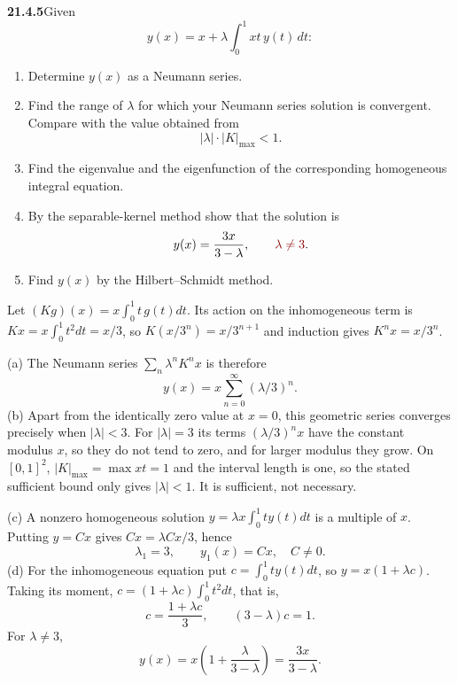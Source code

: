 \par\bigskip
\noindent\textbf{21.4.5}\quad Given
\[
y(x)=x+\lambda\int_{0}^{1}xt\,y(t)\,dt:
\]
\begin{enumerate}
\item[(a)] Determine $y(x)$ as a Neumann series.
\item[(b)] Find the range of $\lambda$ for which your Neumann
series solution is convergent. Compare with the value obtained
from
\[
|\lambda|\cdot|K|_{\max}<1.
\]
\item[(c)] Find the eigenvalue and the eigenfunction of the
corresponding homogeneous integral equation.
\item[(d)] By the separable-kernel method show that the solution
is
\[
y(x)=\frac{3x}{3-\lambda},\qquad\erratum{\lambda\ne3}.
\]
\item[(e)] Find $y(x)$ by the Hilbert--Schmidt method.
\end{enumerate}
\solution
Let $(Kg)(x)=x\int_0^1t\,g(t)dt$. Its action on the
inhomogeneous term is $Kx=x\int_0^1t^2dt=x/3$, so $K(x/3^n)=x/3^{n+1}$
and induction gives $K^nx=x/3^n$.

(a) The Neumann series $\sum_n\lambda^nK^nx$ is therefore
\[
\boxed{y(x)=x\sum_{n=0}^\infty(\lambda/3)^n}.
\]
(b) Apart from the identically zero value at $x=0$, this geometric
series converges precisely when $\boxed{|\lambda|<3}$.
For $|\lambda|=3$ its terms $(\lambda/3)^nx$ have the constant modulus
$x$, so they do not tend to zero, and for larger
modulus they grow. On $[0,1]^2$, $|K|_{\max}=\max xt=1$ and the
interval length is one, so the stated sufficient bound only gives
$|\lambda|<1$. It is sufficient, not necessary.

(c) A nonzero homogeneous solution
$y=\lambda x\int_0^1ty(t)dt$ is a multiple of $x$.
Putting $y=Cx$ gives $Cx=\lambda Cx/3$, hence
\[
\boxed{\lambda_1=3,\qquad y_1(x)=Cx,\quad C\ne0}.
\]
(d) For the inhomogeneous equation put
$c=\int_0^1ty(t)dt$, so $y=x(1+\lambda c)$. Taking its moment,
$c=(1+\lambda c)\int_0^1t^2dt$, that is,
\[
c=\frac{1+\lambda c}{3},\qquad
(3-\lambda)c=1.
\]
For $\lambda\ne3$,
\[
\boxed{y(x)=x\left(1+\frac{\lambda}{3-\lambda}\right)
=\frac{3x}{3-\lambda}}.
\]

